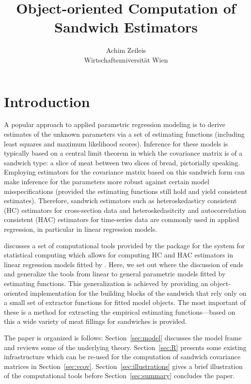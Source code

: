 \documentclass{Z}
\author{Achim Zeileis\\Wirtschaftsuniversit\"at Wien}
\title{Object-oriented Computation of Sandwich Estimators}
\begin{document}


\section{Introduction} \label{sec:intro}

A popular approach to applied parametric regression modeling is to derive estimates
of the unknown parameters via a set of estimating functions (including least squares
and maximum likelihood scores). Inference for these models is typically based on a
central limit theorem in which the covariance matrix is of a sandwich type: a slice
of meat between two slices of bread, pictorially speaking. Employing estimators
for the covariance matrix based on this sandwich form can make inference for the parameters
more robust against certain model misspecifications (provided the estimating
functions still hold and yield consistent estimates). Therefore, sandwich estimators
such as heteroskedasticy consistent (HC) estimators for cross-section data and
heteroskedasitcity and autocorrelation consistent (HAC) estimators for time-series data 
are commonly used in applied regression, in particular in linear regression models.

\cite{hac:Zeileis:2004a} discusses a set of computational tools provided by the
 package for the  system for statistical computing \citep{hac:R:2006}
which allows for computing HC and HAC estimators in linear regression models fitted 
by . Here, we set out where the discussion of \cite{hac:Zeileis:2004a} ends
and generalize the tools from linear to general parametric models fitted by estimating
functions. This generalization is achieved by providing an object-oriented implementation
for the building blocks of the sandwich that rely only on a small set of extractor
functions for fitted model objects. The most important of these is a method for
extracting the empirical estimating functions---based on this a wide variety of 
meat fillings for sandwiches is provided.

The paper is organized is follows: Section~\ref{sec:model} discusses the model frame
and reviews some of the underlying theory. Section~\ref{sec:R} presents some existing
 infrastructure which can be re-used for the computation of sandwich 
covariance matrices in Section~\ref{sec:vcov}. Section~\ref{sec:illustrations} gives
a brief illustration of the computational tools before Section~\ref{sec:summary}
concludes the paper.
\end{document}
